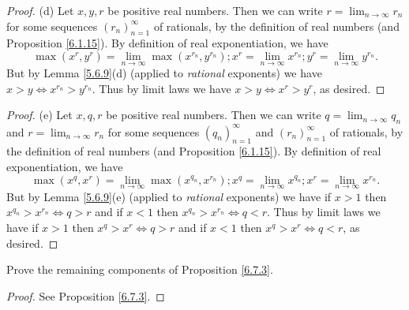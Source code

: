 \begin{proof}{(d)}
    Let \(x, y, r\) be positive real numbers.
    Then we can write \(r = \lim_{n \to \infty} r_n\) for some sequences \((r_n)_{n = 1}^\infty\) of rationals, by the definition of real numbers (and Proposition \ref{6.1.15}).
    By definition of real exponentiation, we have
    \[
        \max(x^r, y^r) = \lim_{n \to \infty} \max(x^{r_n}, y^{r_n}) ; x^r = \lim_{n \to \infty} x^{r_n} ; y^r = \lim_{n \to \infty} y^{r_n}.
    \]
    But by Lemma \ref{5.6.9}(d) (applied to \emph{rational} exponents) we have \(x > y \iff x^{r_n} > y^{r_n}\).
    Thus by limit laws we have \(x > y \iff x^r > y^r\), as desired.
\end{proof}

\begin{proof}{(e)}
    Let \(x, q, r\) be positive real numbers.
    Then we can write \(q = \lim_{n \to \infty} q_n\) and \(r = \lim_{n \to \infty} r_n\) for some sequences \((q_n)_{n = 1}^\infty\) and \((r_n)_{n = 1}^\infty\) of rationals, by the definition of real numbers (and Proposition \ref{6.1.15}).
    By definition of real exponentiation, we have
    \[
        \max(x^q, x^r) = \lim_{n \to \infty} \max(x^{q_n}, x^{r_n}); x^q = \lim_{n \to \infty} x^{q_n} ; x^r = \lim_{n \to \infty} x^{r_n}.
    \]
    But by Lemma \ref{5.6.9}(e) (applied to \emph{rational} exponents) we have if \(x > 1\) then \(x^{q_n} > x^{r_n} \iff q > r\) and if \(x < 1\) then \(x^{q_n} > x^{r_n} \iff q < r\).
    Thus by limit laws we have if \(x > 1\) then \(x^q > x^r \iff q > r\) and if \(x < 1\) then \(x^q > x^r \iff q < r\), as desired.
\end{proof}

\exercisesection

\begin{exercise}\label{ex 6.7.1}
    Prove the remaining components of Proposition \ref{6.7.3}.
\end{exercise}

\begin{proof}
    See Proposition \ref{6.7.3}.
\end{proof}